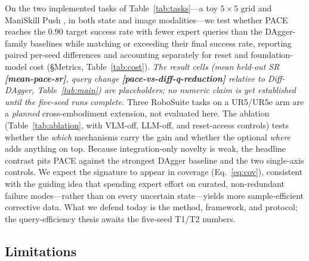 \documentclass[letterpaper]{article} %
\newcommand{\PH}[1]{{\color{red}\textbf{[#1]}}}
\begin{document}
On the two implemented tasks of Table~\ref{tab:tasks}---a toy $5\times5$ grid and ManiSkill
Push \cite{florence2021implicitbc,tao2024maniskill3}, in both state and image modalities---we
test whether PACE reaches the $0.90$ target success rate with
fewer expert queries than the DAgger-family baselines while matching or exceeding their
final success rate, reporting paired per-seed differences and
accounting separately for reset and foundation-model cost (\S Metrics,
Table~\ref{tab:cost}). \emph{The result cells (mean held-out SR \PH{mean-pace-sr}, query
change \PH{pace-vs-diff-q-reduction} relative to Diff-DAgger, Table~\ref{tab:main}) are
placeholders; no numeric claim is yet established until the five-seed runs complete.}
Three RoboSuite tasks on a UR5/UR5e arm \cite{zhu2020robosuite}
are a \emph{planned} cross-embodiment extension, not evaluated here. The
ablation (Table~\ref{tab:ablation}, with VLM-off, LLM-off, and reset-access controls)
tests whether the \emph{which} mechanisms carry the gain and whether the optional
\emph{where} adds anything on top. Because integration-only novelty is weak, the
headline contrast pits PACE against the strongest DAgger baseline and the two
single-axis controls. We expect the signature to appear in coverage (Eq.~\eqref{eq:cov}),
consistent with the guiding idea that spending expert effort on curated, non-redundant
failure modes---rather than on every uncertain state---yields more sample-efficient
corrective data. What we defend today is the method, framework, and protocol;
the query-efficiency thesis awaits the five-seed T1/T2 numbers.

\subsection{Limitations}
\label{sec:limitations}
\end{document}
